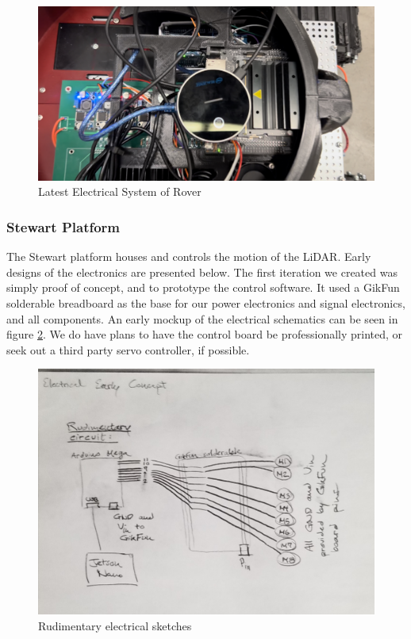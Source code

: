 \documentclass[a4paper, 10pt]{article}
\begin{document}
		\begin{figure} [!h]
			\centering
			\includegraphics[scale=0.25]{Photos/Rover PCB (Assembled)}
			\caption{Latest Electrical System of Rover}
			\label{latest_electrical}
		\end{figure}
 		
 		\subsubsection*{Stewart Platform}
 		The Stewart platform houses and controls the motion of the LiDAR. Early designs of the electronics are presented below. The first iteration we created was simply proof of concept, and to prototype the control software. It used a GikFun solderable breadboard as the base for our power electronics and signal electronics, and all components. An early mockup of the electrical schematics can be seen in figure \ref{basic_electrical}. We do have plans to have the control board be professionally printed, or seek out a third party servo controller, if possible.
 		
 		\begin{figure} [!h]
			\centering
			\includegraphics[scale=0.2]{Photos/early_electrical}
			\caption{Rudimentary electrical sketches}
			\label{basic_electrical}
		\end{figure}
\end{document}
